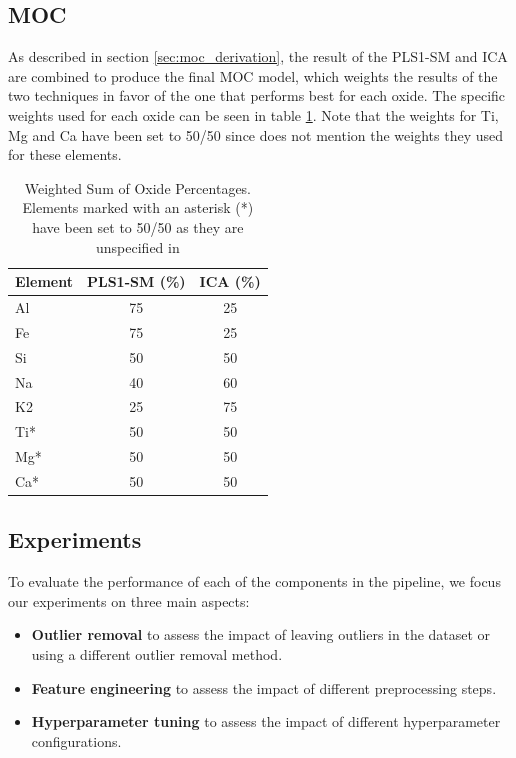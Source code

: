 \subsection{MOC}\label{sec:methodology_moc}
As described in section \ref{sec:moc_derivation}, the result of the PLS1-SM and ICA are combined to produce the final MOC model, which weights the results of the two techniques in favor of the one that performs best for each oxide.
The specific weights used for each oxide can be seen in table \ref{tab:weighted_sum_oxide}.
Note that the weights for Ti, Mg and Ca have been set to 50/50 since \citet{cleggRecalibrationMarsScience2017} does not mention the weights they used for these elements.

\begin{table}[h]
\centering
\begin{tabular*}{\columnwidth}{@{\extracolsep{\fill}}lcc}
\toprule
Element  & PLS1-SM (\%) & ICA (\%) \\ \midrule
Al       & 75           & 25      \\
Fe       & 75           & 25      \\
Si       & 50           & 50      \\
Na       & 40           & 60      \\
K2       & 25           & 75      \\
Ti*      & 50           & 50      \\
Mg*      & 50           & 50      \\
Ca*      & 50           & 50      \\
\bottomrule
\end{tabular*}
\caption{Weighted Sum of Oxide Percentages. Elements marked with an asterisk (*) have been set to 50/50 as they are unspecified in \citet{cleggRecalibrationMarsScience2017}}
\label{tab:weighted_sum_oxide}
\end{table}

\subsection{Experiments}\label{sec:methodology_experiments}
To evaluate the performance of each of the components in the pipeline, we focus our experiments on three main aspects:

\begin{itemize}
	\item \textbf{Outlier removal} to assess the impact of leaving outliers in the dataset or using a different outlier removal method.
	\item \textbf{Feature engineering} to assess the impact of different preprocessing steps.
	\item \textbf{Hyperparameter tuning} to assess the impact of different hyperparameter configurations.
\end{itemize}

